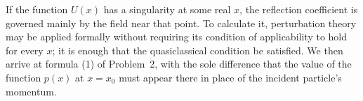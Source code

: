 If the function $U(x)$ has a singularity at some real $x$, the reflection
coefficient is governed mainly by the field near that point. To calculate it,
perturbation theory may be applied formally without requiring its condition of
applicability to hold for every $x$; it is enough that the quasiclassical
condition be satisfied. We then arrive at formula (1) of Problem~2, with the
sole difference that the value of the function $p(x)$ at $x=x_0$ must appear
there in place of the incident particle's momentum.
